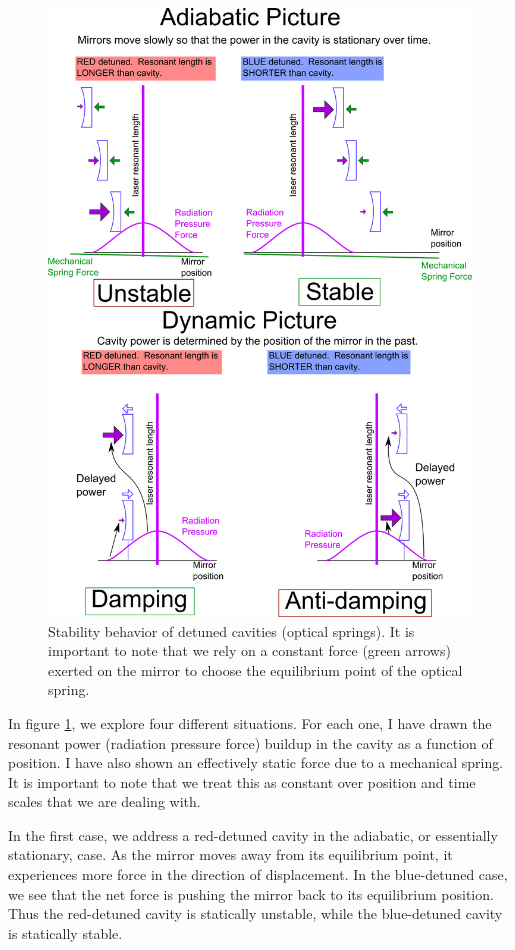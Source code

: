 \begin{figure}[htbp]%
\center
\includegraphics[width=.9\textwidth]{figures/introduction/cavity}%
\caption[Optical spring stability]{Stability behavior of detuned cavities (optical springs). It is important to note that we rely on a constant force (green arrows) exerted on the mirror to choose the equilibrium point of the optical spring.}%
\label{fig:opticalsprings}%
\end{figure}

In figure \ref{fig:opticalsprings}, we explore four different situations. For each one, I have drawn the resonant power (radiation pressure force) buildup in the cavity as a function of position. I have also shown an effectively static force due to a mechanical spring. It is important to note that we treat this as constant over position and time scales that we are dealing with.

In the first case, we address a red-detuned cavity in the adiabatic, or essentially stationary, case. As the mirror moves away from its equilibrium point, it experiences more force in the direction of displacement. In the blue-detuned case, we see that the net force is pushing the mirror back to its equilibrium position. Thus the red-detuned cavity is statically unstable, while the blue-detuned cavity is statically stable.

